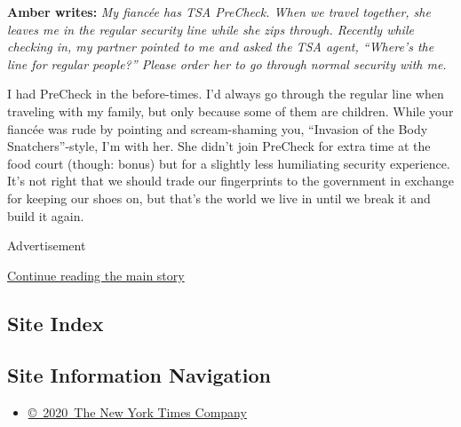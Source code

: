 \textbf{Amber writes:} \emph{My fiancée has TSA PreCheck. When we travel
together, she leaves me in the regular security line while she zips
through. Recently while checking in, my partner pointed to me and asked
the TSA agent, ``Where's the line for regular people?'' Please order her
to go through normal security with me.}

I had PreCheck in the before-times. I'd always go through the regular
line when traveling with my family, but only because some of them are
children. While your fiancée was rude by pointing and scream-shaming
you, ``Invasion of the Body Snatchers''-style, I'm with her. She didn't
join PreCheck for extra time at the food court (though: bonus) but for a
slightly less humiliating security experience. It's not right that we
should trade our fingerprints to the government in exchange for keeping
our shoes on, but that's the world we live in until we break it and
build it again.

Advertisement

\protect\hyperlink{after-bottom}{Continue reading the main story}

\hypertarget{site-index}{%
\subsection{Site Index}\label{site-index}}

\hypertarget{site-information-navigation}{%
\subsection{Site Information
Navigation}\label{site-information-navigation}}

\begin{itemize}
\tightlist
\item
  \href{https://help.nytimes.com/hc/en-us/articles/115014792127-Copyright-notice}{©~2020~The
  New York Times Company}
\end{itemize}

